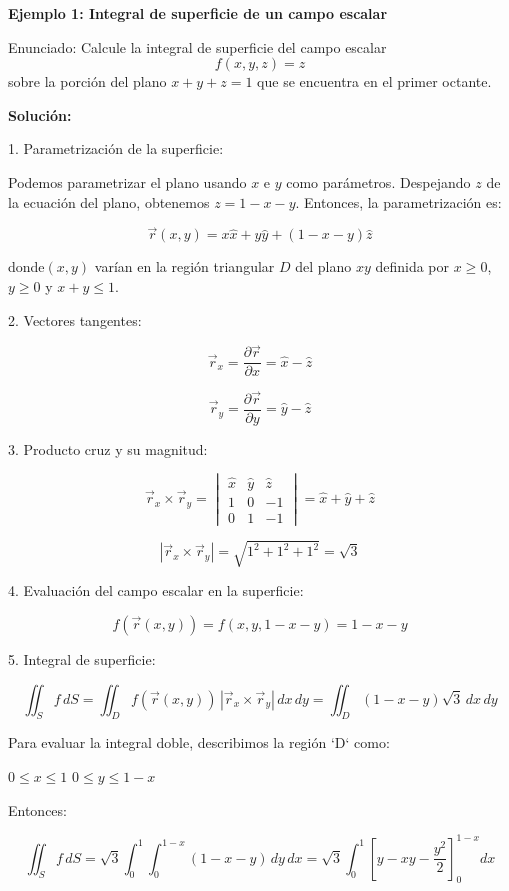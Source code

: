\documentclass{article}
\begin{document}
\textbf{Ejemplo 1: Integral de superficie de un campo escalar}

Enunciado: Calcule la integral de superficie del campo escalar  $$f(x, y, z) = z$$ sobre la porción del plano $x + y + z = 1$ que se encuentra en el primer octante.

\textbf{Solución:}

1. Parametrización de la superficie:

Podemos parametrizar el plano usando $x$ e $y$ como parámetros.  Despejando $z$ de la ecuación del plano, obtenemos $z = 1 - x - y$.  Entonces, la parametrización es:

\[
\vec{r}(x, y) = x\hat{x} + y\hat{y} + (1 - x - y)\hat{z}
\]

donde$(x, y)$ varían en la región triangular $D$ del plano $xy$ definida por $x \geq 0$, $y \geq 0$ y $x + y \leq 1$.

2. Vectores tangentes:

\[
\vec{r}_x = \frac{\partial \vec{r}}{\partial x} = \hat{x} - \hat{z}
\]

\[
\vec{r}_y = \frac{\partial \vec{r}}{\partial y} = \hat{y} - \hat{z}
\]

3. Producto cruz y su magnitud:

\[
\vec{r}_x \times \vec{r}_y = \begin{vmatrix}
\hat{x} & \hat{y} & \hat{z} \\
1 & 0 & -1 \\
0 & 1 & -1
\end{vmatrix} = \hat{x} + \hat{y} + \hat{z}
\]

\[
|\vec{r}_x \times \vec{r}_y| = \sqrt{1^2 + 1^2 + 1^2} = \sqrt{3}
\]

4. Evaluación del campo escalar en la superficie:

\[
f(\vec{r}(x, y)) = f(x, y, 1 - x - y) = 1 - x - y
\]

5. Integral de superficie:

\[
\iint_S f \, dS = \iint_D f(\vec{r}(x, y)) \, |\vec{r}_x \times \vec{r}_y| \, dx \, dy = \iint_D (1 - x - y) \sqrt{3} \, dx \, dy
\]

Para evaluar la integral doble, describimos la región `D` como:

$0 \leq x \leq 1$
$0 \leq y \leq 1 - x$

Entonces:

\[
\iint_S f \, dS = \sqrt{3} \int_0^1 \int_0^{1-x} (1 - x - y) \, dy \, dx = \sqrt{3} \int_0^1 \left[ y - xy - \frac{y^2}{2} \right]_0^{1-x} dx
\]
\end{document}
